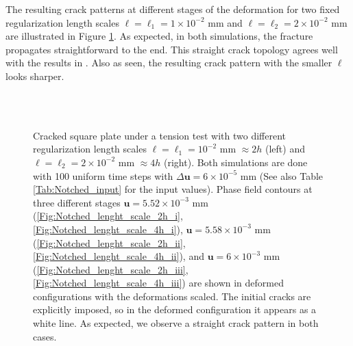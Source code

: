 The resulting crack patterns at different stages of the deformation for two fixed regularization length scales $\ell = \ell_1 = 1\times 10^{-2}$ mm and $\ell = \ell_2=2 \times 10^{-2}$ mm are illustrated in Figure \ref{Fig:Notched_snapshots}. 
As expected, in both simulations, the fracture propagates straightforward to the end. This straight crack topology agrees well with the results in \cite{miehe2010thermodynamically}. Also as seen, the resulting crack pattern with the smaller $\ell$ looks sharper.

\begin{figure}[!htb]
    \centering
    \\
    \\

    \caption{Cracked square plate under a tension test {with two different regularization length scales $\ell=\ell_1 = 10^{-2}$ mm $\approx 2h$ (left) and $\ell=\ell_2 = 2\times 10^{-2}$ mm $\approx 4h$ (right)}. Both simulations are done with 100 uniform time steps with $\Delta\bm{u}= 6 \times 10^{-5}$ mm (See also Table \ref{Tab:Notched_input} for the input values). Phase field contours at three different stages $\bm{u}=5.52 \times 10^{-3}$ mm (\ref{Fig:Notched_lenght_scale_2h_i},\ref{Fig:Notched_lenght_scale_4h_i}), $\bm{u}=5.58 \times 10^{-3}$ mm (\ref{Fig:Notched_lenght_scale_2h_ii},\ref{Fig:Notched_lenght_scale_4h_ii}), and $\bm{u}=6 \times 10^{-3}$ mm (\ref{Fig:Notched_lenght_scale_2h_iii},\ref{Fig:Notched_lenght_scale_4h_iii}) are shown in deformed configurations with the deformations scaled. The initial cracks are explicitly imposed, so in the deformed configuration it appears as a white line. As expected, we observe a straight crack pattern in both cases.
    }
    \label{Fig:Notched_snapshots}
\end{figure}

